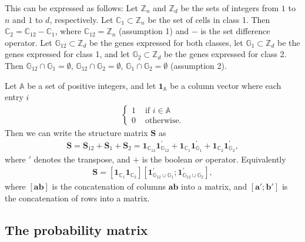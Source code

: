 \documentclass[12pt]{article}
\begin{document}
This can be expressed as follows:
Let $\mathbb{Z}_n$ and $\mathbb{Z}_d$ be the sets of integers from $1$ to $n$ and $1$ to $d$, respectively. 
Let $\mathbb{C}_1 \subset \mathbb{Z}_n$ be the set of cells in class 1.
Then $\mathbb{C}_2 = \mathbb{C}_{12} - \mathbb{C}_1$, where $\mathbb{C}_{12} = \mathbb{Z}_n$ (assumption 1) and $-$ is the set difference operator. 
Let $\mathbb{G}_{12} \subset \mathbb{Z}_d$ be the genes expressed for both classes, let $\mathbb{G}_{1} \subset \mathbb{Z}_d$ be the genes expressed for class 1, and let $\mathbb{G}_{2} \subset \mathbb{Z}_d$ be the genes expressed for class 2. 
Then $\mathbb{G}_{12} \cap \mathbb{G}_{1} = \emptyset$,  $\mathbb{G}_{12} \cap \mathbb{G}_{2} = \emptyset$,  $\mathbb{G}_{1} \cap \mathbb{G}_{2} = \emptyset$ (assumption 2).

Let $\mathbb{A}$ be a set of positive integers, and let $\mathbf{1}_{\mathbb{A}}$ be a column vector where each entry $i$
\begin{align}
  \begin{cases}
   1 &  \text{ if } i \in \mathbb{A} \\
   0 & \text{ otherwise.}
  \end{cases}
\end{align}
Then we can write the structure matrix $\mathbf{S}$ as 
\begin{align}
  \mathbf{S} = \mathbf{S}_{12}+ \mathbf{S}_1 + \mathbf{S}_2 = \mathbf{1}_{\mathbb{C}_{12}}\mathbf{1}^{\prime}_{\mathbb{G}_{12}} +  \mathbf{1}_{\mathbb{C}_{1}}\mathbf{1}^{\prime}_{\mathbb{G}_{1}} +  \mathbf{1}_{\mathbb{C}_{2}}\mathbf{1}^{\prime}_{\mathbb{G}_{2}},
\end{align}
where $\prime$ denotes the transpose, and $+$ is the boolean $or$ operator. 
Equivalently
\begin{align}
  \mathbf{S} = [\mathbf{1}_{\mathbb{C}_{1}} \mathbf{1}_{\mathbb{C}_{2}}] [\mathbf{1}^{\prime}_{\mathbb{G}_{12} \cup {\mathbb{G}_{1}}}; \mathbf{1}^{\prime}_{\mathbb{G}_{12} \cup {\mathbb{G}_{2}}}],
\end{align}
where $[\mathbf{a} \mathbf{b}]$ is the concatenation of columns $\mathbf{a} \mathbf{b}$ into a matrix, and $[\mathbf{a}\prime ; \mathbf{b}\prime]$ is the concatenation of rows into a matrix. 

\subsection{The probability matrix} \label{sec:Prob} %
\end{document}

